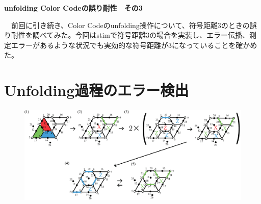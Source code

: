 \documentclass[a4paper,10pt]{ltjsarticle}
\begin{document}
\centerline{\LARGE\bfseries unfolding Color Codeの誤り耐性　その3}
\vspace{10pt}
　前回に引き続き、Color Codeのunfolding操作について、符号距離3のときの誤り耐性を調べてみた。今回はstimで符号距離3の場合を実装し、エラー伝播、測定エラーがあるような状況でも実効的な符号距離が3になっていることを確かめた。
\section{Unfolding過程のエラー検出}{
    \begin{figure}[h]
        \centering
        \includegraphics[scale=0.28]{figure/figure1.eps}
        \caption{ }
        \label{figure1}
    \end{figure}

}
\end{document}
